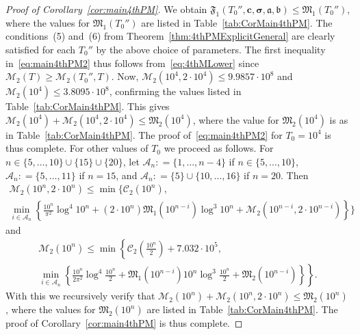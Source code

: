 \documentclass[a4paper,reqno]{amsart}
\theoremstyle{definition}
\newcommand{\de}[0]{\mathrel{\mathop:}=}
\begin{document}
\begin{proof}[Proof of Corollary~\ref{cor:main4thPM}]
We obtain $\mathfrak{F}_1\left(T_0'',\bm{c},\bm{\sigma},\bm{\mathfrak{a}},\bm{\mathfrak{b}}\right)\leq \mathfrak{M}_{1}\left(T_0''\right)$, where the values for $\mathfrak{M}_{1}\left(T_0''\right)$ are listed in Table~\ref{tab:CorMain4thPM}. The conditions~(5) and~(6) from Theorem~\ref{thm:4thPMExplicitGeneral} are clearly satisfied for each $T_0''$ by the above choice of parameters. The first inequality in~\eqref{eq:main4thPM2} thus follows from~\eqref{eq:4thMLower} since $\mathcal{M}_{2}(T)\geq \mathcal{M}_{2}\left(T_0'',T\right)$. Now, $\mathcal{M}_{2}\left(10^4,2\cdot 10^4\right)\leq 9.9857\cdot10^8$ and $\mathcal{M}_{2}\left(10^4\right)\leq 3.8095\cdot10^8$, confirming the values listed in Table~\ref{tab:CorMain4thPM}. This gives $\mathcal{M}_{2}\left(10^4\right)+\mathcal{M}_{2}\left(10^4,2\cdot 10^4\right)\leq\mathfrak{M}_{2}\left(10^4\right)$, where the value for $\mathfrak{M}_{2}\left(10^4\right)$ is as in Table~\ref{tab:CorMain4thPM}. The proof of~\eqref{eq:main4thPM2} for $T_0=10^4$ is thus complete. For other values of $T_0$ we proceed as follows. For $n\in\{5,\ldots,10\}\cup\{15\}\cup\{20\}$, let $\mathscr{A}_n\de\{1,\ldots,n-4\}$ if $n\in\{5,\ldots,10\}$, $\mathscr{A}_n\de\{5,\ldots,11\}$ if $n=15$, and $\mathscr{A}_n\de\{5\}\cup\{10,\ldots,16\}$ if $n=20$. Then
\begin{multline*}
\mathcal{M}_{2}\left(10^n,2\cdot 10^n\right) \leq \min\biggl\{\mathcal{C}_{2}\left(10^n\right), \\
\min_{i\in\mathscr{A}_n}\left\{\frac{10^n}{\pi^2}\log^{4}{10^n}+\left(2\cdot10^n\right)\mathfrak{M}_{1}\left(10^{n-i}\right)\log^{3}{10^n}+\mathcal{M}_{2}\left(10^{n-i},2\cdot10^{n-i}\right)\right\}\biggr\}
\end{multline*}
and
\begin{multline*}
\mathcal{M}_{2}\left(10^n\right) \leq \min\left\{\mathcal{C}_{2}\left(\frac{10^n}{2}\right)+7.032\cdot10^{5},\right. \\
\left.\min_{i\in\mathscr{A}_n}\left\{\frac{10^n}{2\pi^2}\log^{4}{\frac{10^n}{2}}+\mathfrak{M}_{1}\left(10^{n-i}\right)10^{n}\log^{3}{\frac{10^n}{2}}+\mathfrak{M}_{2}\left(10^{n-i}\right)\right\}\right\}.
\end{multline*}
With this we recursively verify that $\mathcal{M}_{2}\left(10^n\right)+\mathcal{M}_{2}\left(10^n,2\cdot 10^n\right)\leq\mathfrak{M}_{2}\left(10^n\right)$, where the values for $\mathfrak{M}_{2}\left(10^n\right)$ are listed in Table~\ref{tab:CorMain4thPM}. The proof of Corollary~\ref{cor:main4thPM} is thus complete.
\end{proof}
\end{document}
